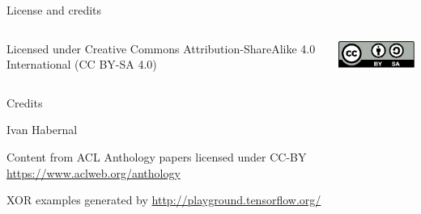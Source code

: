\documentclass[12pt,aspectratio=169,handout]{beamer}
\begin{document}
\begin{frame}{License and credits}

	\begin{columns}
		\begin{column}{0.7\textwidth}
			Licensed under Creative Commons Attribution-ShareAlike 4.0 International (CC BY-SA 4.0)
		\end{column}
		\begin{column}{0.2\textwidth}
			\includegraphics[width=0.9\linewidth]{img/cc-by-sa-icon.pdf}
		\end{column}
	\end{columns}
	
	\bigskip
	
	Credits
	
	\begin{scriptsize}
		
		Ivan Habernal
		
		Content from ACL Anthology papers licensed under CC-BY \url{https://www.aclweb.org/anthology}
		
		XOR examples generated by \url{http://playground.tensorflow.org/}
		
	\end{scriptsize}
	
\end{frame}
\end{document}
